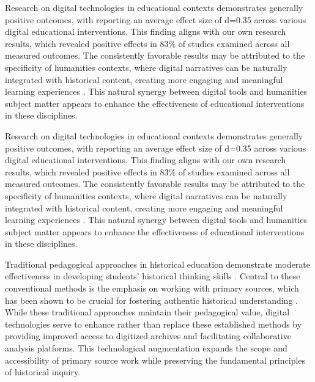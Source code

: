 \documentclass[
hf,
]{ceurart}
\begin{document}
Research on digital technologies in educational contexts demonstrates generally positive outcomes, with \cite{tamim2011} reporting an average effect size of d=0.35 across various digital educational interventions. This finding aligns with our own research results, which revealed positive effects in 83\% of studies examined across all measured outcomes. The consistently favorable results may be attributed to the specificity of humanities contexts, where digital narratives can be naturally integrated with historical content, creating more engaging and meaningful learning experiences \cite{Crymble2021}. This natural synergy between digital tools and humanities subject matter appears to enhance the effectiveness of educational interventions in these disciplines.


Research on digital technologies in educational contexts demonstrates generally positive outcomes, with \cite{tamim2011} reporting an average effect size of d=0.35 across various digital educational interventions. This finding aligns with our own research results, which revealed positive effects in 83\% of studies examined across all measured outcomes. The consistently favorable results may be attributed to the specificity of humanities contexts, where digital narratives can be naturally integrated with historical content, creating more engaging and meaningful learning experiences \cite{Crymble2021}. This natural synergy between digital tools and humanities subject matter appears to enhance the effectiveness of educational interventions in these disciplines.

Traditional pedagogical approaches in historical education demonstrate moderate effectiveness in developing students' historical thinking skills \cite{MonteSano2012}. Central to these conventional methods is the emphasis on working with primary sources, which has been shown to be crucial for fostering authentic historical understanding \cite{reisman2012}. While these traditional approaches maintain their pedagogical value, digital technologies serve to enhance rather than replace these established methods by providing improved access to digitized archives and facilitating collaborative analysis platforms. This technological augmentation expands the scope and accessibility of primary source work while preserving the fundamental principles of historical inquiry.
\end{document}
